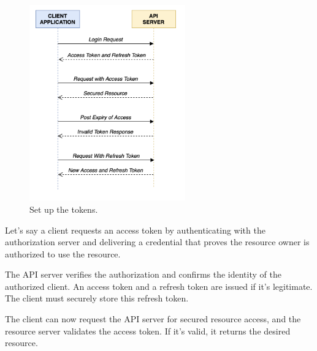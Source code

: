 \begin{figure}[H]
  \centering
  \includegraphics[width=0.6\textwidth]{Figures/Implementation/Tokens.png}
  \caption{Set up the tokens.}
\end{figure}

Let’s say a client requests an access token by authenticating with the authorization server and delivering a credential that proves the resource owner is authorized to use the resource.

The API server verifies the authorization and confirms the identity of the authorized client. An access token and a refresh token are issued if it’s legitimate. The client must securely store this refresh token.

The client can now request the API server for secured resource access, and the resource server validates the access token. If it’s valid, it returns the desired resource.